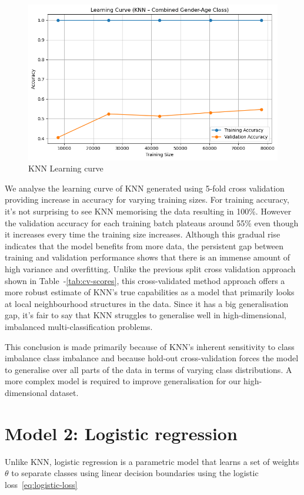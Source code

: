 \documentclass[10pt,twocolumn]{article}
\begin{document}
\begin{figure}[H]
    \centering
    \includegraphics[width=0.85\linewidth]{images/knn/learning rate and cross validation.png}
    \caption{KNN Learning curve}
    \label{fig:knn-lrate}
\end{figure}
We analyse the learning curve of KNN generated using 5-fold cross validation providing increase in accuracy for varying training sizes. For training accuracy, it's not surprising to see KNN memorising the data resulting in 100\%. However the validation accuracy for each training batch plateaus around 55\% even though it increases every time the training size increases. Although this gradual rise indicates that the model benefits from more data, the persistent gap between training and validation performance shows that there is an immense amount of high variance and overfitting. Unlike the previous split cross validation approach shown in Table~-\ref{tab:cv-scores}, this cross-validated method approach offers a more robust estimate of KNN's true capabilities as a model that primarily looks at local neighbourhood structures in the data. Since it has a big generalisation gap, it's fair to say that KNN struggles to generalise well in high-dimensional, imbalanced multi-classification problems. 

This conclusion is made primarily because of KNN's inherent sensitivity to class imbalance class imbalance and because hold-out cross-validation forces the model to generalise over all parts of the data in terms of varying class distributions.  A more complex model is required to improve generalisation for our high-dimensional dataset.

\section{Model 2: Logistic regression}
Unlike KNN, logistic regression is a parametric model that learns a set of weights $\theta$ to separate classes using linear decision boundaries using the logistic loss~\ref{eq:logistic-loss}
\end{document}
